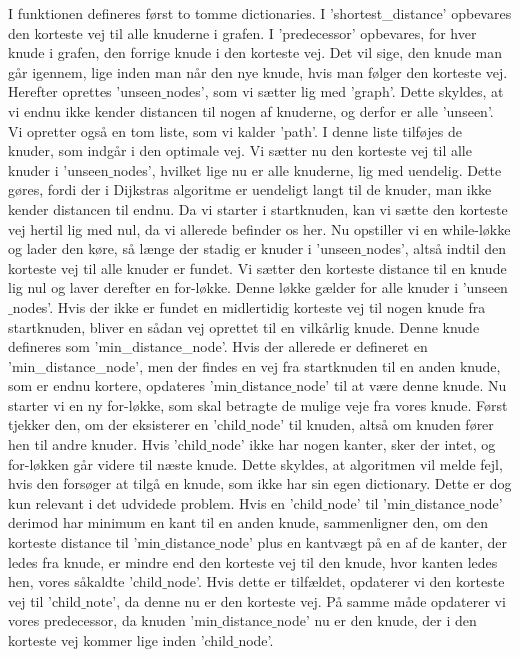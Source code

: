 I funktionen defineres først to tomme dictionaries. I 'shortest\_distance' opbevares den korteste vej til alle knuderne i grafen. I 'predecessor' opbevares, for hver knude i grafen, den forrige knude i den korteste vej. Det vil sige, den knude man går igennem, lige inden man når den nye knude, hvis man følger den korteste vej. Herefter oprettes 'unseen$\_$nodes', som vi sætter lig med 'graph'. Dette skyldes, at vi endnu ikke kender distancen til nogen af knuderne, og derfor er alle 'unseen'. Vi opretter også en tom liste, som vi kalder 'path'. I denne liste tilføjes de knuder, som indgår i den optimale vej.
Vi sætter nu den korteste vej til alle knuder i 'unseen$\_$nodes', hvilket lige nu er alle knuderne, lig med uendelig. Dette gøres, fordi der i Dijkstras algoritme er uendeligt langt til de knuder, man ikke kender distancen til endnu. Da vi starter i startknuden, kan vi sætte den korteste vej hertil lig med nul, da vi allerede befinder os her.
Nu opstiller vi en while-løkke og lader den køre, så længe der stadig er knuder i 'unseen$\_$nodes', altså indtil den korteste vej til alle knuder er fundet.
Vi sætter den korteste distance til en knude lig nul og laver derefter en for-løkke. Denne løkke gælder for alle knuder i 'unseen$\_$nodes'. Hvis der ikke er fundet en midlertidig korteste vej til nogen knude fra startknuden, bliver en sådan vej oprettet til en vilkårlig knude. Denne knude defineres som 'min\_distance\_node'. Hvis der allerede er defineret en 'min\_distance\_node', men der findes en vej fra startknuden til en anden knude, som er endnu kortere, opdateres 'min$\_$distance$\_$node' til at være denne knude.
Nu starter vi en ny for-løkke, som skal betragte de mulige veje fra vores knude.
Først tjekker den, om der eksisterer en 'child$\_$node' til knuden, altså om knuden fører hen til andre knuder. Hvis 'child$\_$node' ikke har nogen kanter, sker der intet, og for-løkken går videre til næste knude. Dette skyldes, at algoritmen vil melde fejl, hvis den forsøger at tilgå en knude, som ikke har sin egen dictionary. Dette er dog kun relevant i det udvidede problem.
Hvis en 'child$\_$node' til 'min$\_$distance$\_$node' derimod har minimum en kant til en anden knude, sammenligner den, om den korteste distance til 'min$\_$distance$\_$node' plus en kantvægt på en af de kanter, der ledes fra knude, er mindre end den korteste vej til den knude, hvor kanten ledes hen, vores såkaldte 'child$\_$node'. Hvis dette er tilfældet, opdaterer vi den korteste vej til 'child$\_$note', da denne nu er den korteste vej. På samme måde opdaterer vi vores predecessor, da knuden 'min$\_$distance$\_$node' nu er den knude, der i den korteste vej kommer lige inden 'child$\_$node'.

